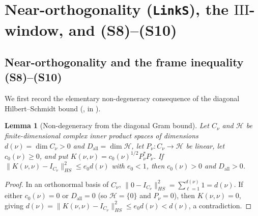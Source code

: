 \documentclass[11pt]{amsart}
\newcommand{\Sha}{\mathrm{III}}
\theoremstyle{plain}
\newtheorem{lemma}[theorem]{Lemma}
\theoremstyle{definition}
\numberwithin{equation}{section}
\begin{document}
\section{Near-orthogonality (\texttt{LinkS}), the \texorpdfstring{$\Sha$}{Sha}-window, and (S8)--(S10)}\label{sec:S8VWin}

\subsection{Near-orthogonality and the frame inequality (S8)--(S10)}

We first record the elementary non-degeneracy consequence of the diagonal Hilbert--Schmidt bound
(,  in ).

\begin{lemma}[Non-degeneracy from the diagonal Gram bound]\label{lem:diagnondeg}
Let $C_\nu$ and $\mathcal H$ be finite-dimensional complex inner product spaces of dimensions
$d(\nu)=\dim C_\nu>0$ and $D_{\mathrm{all}}=\dim\mathcal H$, let $P_\nu:C_\nu\to\mathcal H$ be
linear, let $c_0(\nu)\ge0$, and put $K(\nu,\nu)=c_0(\nu)^{1/2}P_\nu^\ast P_\nu$. If
$\|K(\nu,\nu)-I_{C_\nu}\|_{HS}^2\le e_0 d(\nu)$ with $e_0<1$, then $c_0(\nu)>0$ and
$D_{\mathrm{all}}>0$.
\end{lemma}

\begin{proof}
In an orthonormal basis of $C_\nu$, $\|0-I_{C_\nu}\|_{HS}^2=\sum_{\ell=1}^{d(\nu)}1=d(\nu)$. If
either $c_0(\nu)=0$ or $D_{\mathrm{all}}=0$ (so $\mathcal H=\{0\}$ and $P_\nu=0$), then
$K(\nu,\nu)=0$, giving $d(\nu)=\|K(\nu,\nu)-I_{C_\nu}\|_{HS}^2\le e_0 d(\nu)<d(\nu)$, a
contradiction.
\end{proof}
\end{document}
